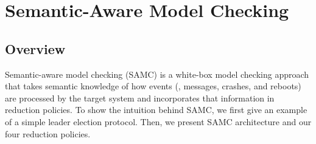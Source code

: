 
\chapter{Semantic-Aware Model Checking}
\label{sec-samc}



\section{Overview}
Semantic-aware model checking (SAMC) is a white-box model checking
approach that takes semantic knowledge of how events (\eg, messages,
crashes, and reboots) are processed by the target system and
incorporates that information in reduction policies.  To show the
intuition behind SAMC, we first give an example of  a simple leader
election protocol. Then, we present SAMC architecture and our four
reduction policies.







